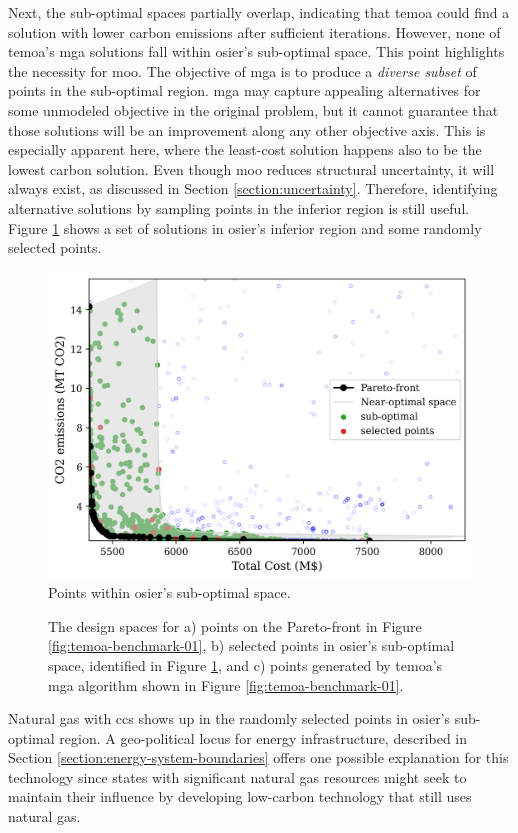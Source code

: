 Next, the sub-optimal spaces partially overlap, indicating that \ac{temoa} could
find a solution with lower carbon emissions after sufficient iterations.
However, none of \ac{temoa}'s \ac{mga} solutions fall within \ac{osier}'s
sub-optimal space. This point highlights the necessity for \acl{moo}. The
objective of \ac{mga} is to produce a \textit{diverse subset} of points in the
sub-optimal region. \ac{mga} may capture appealing alternatives for some
unmodeled objective in the original problem, but it cannot guarantee that those
solutions will be an improvement along any other objective axis. This is
especially apparent here, where the least-cost solution happens also to be the
lowest carbon solution. Even though \ac{moo} reduces structural uncertainty, it
will always exist, as discussed in Section \ref{section:uncertainty}. Therefore,
identifying alternative solutions by sampling points in the inferior region is
still useful. Figure \ref{fig:temoa-benchmark-02} shows a set of solutions in
\ac{osier}'s inferior region and some randomly selected points.



\begin{figure}[h]
  \centering
  \includegraphics[width=0.6\columnwidth]{figures/results/osier_mga_subset_01.png}
  \caption{Points within \ac{osier}'s sub-optimal space.}
  \label{fig:temoa-benchmark-02}
\end{figure}


\begin{figure}[h]
  \centering
  \resizebox{\columnwidth}{!}{}
  \caption{The design spaces for a) points on the Pareto-front in Figure
  \ref{fig:temoa-benchmark-01}, b) selected points in \ac{osier}'s sub-optimal
  space, identified in Figure \ref{fig:temoa-benchmark-02}, and c) points
  generated by \ac{temoa}'s \ac{mga} algorithm shown in Figure
  \ref{fig:temoa-benchmark-01}.}
  \label{fig:temoa-benchmark-03}
\end{figure}

Natural gas with \ac{ccs} shows up in the randomly selected points in
\ac{osier}'s sub-optimal region. A geo-political locus for energy
infrastructure, described in Section \ref{section:energy-system-boundaries}
offers one possible explanation for this technology since states with
significant natural gas resources might seek to maintain their influence by
developing low-carbon technology that still uses natural gas.